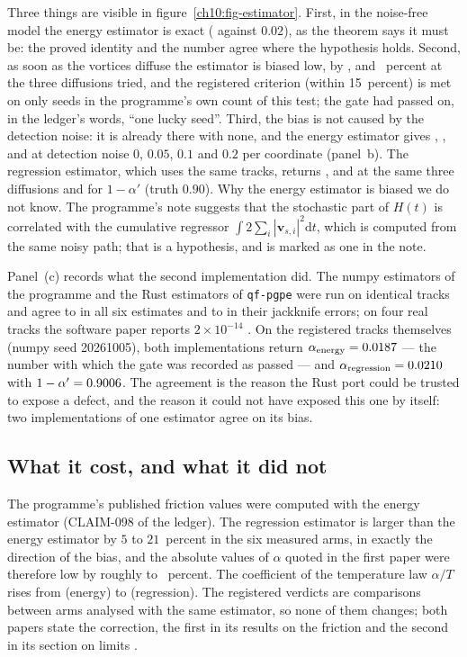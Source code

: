 Three things are visible in figure~\ref{ch10:fig-estimator}. First, in the noise-free model the energy estimator is exact (\NxGateEnergyZ{} against
$0.02$), as the theorem says it must be: the proved identity and the number agree where the hypothesis holds. Second, as soon as the vortices diffuse
the estimator is biased low, by \NxGateBiaseA, \NxGateBiaseB and \NxGateBiaseC~percent at the three diffusions tried, and the registered criterion
(within 15~percent) is met on only \NxQGatePassSeeds{} seeds in the programme's own count of this test; the gate had passed on, in the ledger's words,
``one lucky seed''. Third, the bias is not caused
by the detection noise: it is already there with none, and the energy estimator gives \NxGatenEnergyZ, \NxGatenEnergyA, \NxGatenEnergyB and \NxGatenEnergyC{} at
detection noise $0$, $0.05$, $0.1$ and $0.2$ per coordinate (panel~b). The regression estimator, which uses the same tracks, returns
\NxGateRegA, \NxGateRegB and \NxGateRegC{} at the same three diffusions and \NxGateOneminusapC{} for $1-\alpha'$ (truth $0.90$). Why the energy
estimator is biased we do not know. The programme's note suggests that the stochastic part of $H(t)$ is correlated with the cumulative regressor
$\int2\sum_i|\mathbf v_{s,i}|^2\mathrm dt$, which is computed from the same noisy path; that is a hypothesis, and is marked as one in the note.

Panel~(c) records what the second implementation did. The numpy estimators of the programme and the Rust estimators of \texttt{qf-pgpe} were run on
identical tracks and agree to \NxCrossMaxest{} in all six estimates and to \NxCrossMaxerr{} in their jackknife errors; on four real tracks the
software paper reports $2\times10^{-14}$ \cite{Callens2026sw}. On the registered tracks themselves (numpy seed 20261005), both implementations return $\alpha_{\rm energy}=0.0187$ --- the number with which the gate was recorded as
passed --- and $\alpha_{\rm regression}=0.0210$ with $1-\alpha'=0.9006$. The agreement is the reason the Rust port could be trusted to expose a
defect, and the reason it could not have exposed this one by itself: two implementations of one estimator agree on its bias.

\subsection*{What it cost, and what it did not}

The programme's published friction values were computed with the energy estimator (CLAIM-098 of the ledger). The regression estimator is larger than the energy estimator by
$5$ to $21$~percent in the six measured arms, in exactly the direction of the bias, and the absolute values of $\alpha$ quoted in the first paper
\cite{Callens2026a} were therefore low by roughly \NxQBiasLo{} to \NxQBiasHi{}~percent. The coefficient of the temperature law
$\alpha/T$ rises from \NxQAlphatEnergy{} (energy) to \NxQAlphatReg{} (regression). The registered verdicts are comparisons between arms analysed with the same estimator, so none of them changes; both papers state the correction, the first in its results on the friction \cite{Callens2026a} and the second in its section on limits \cite{Callens2026b}.

